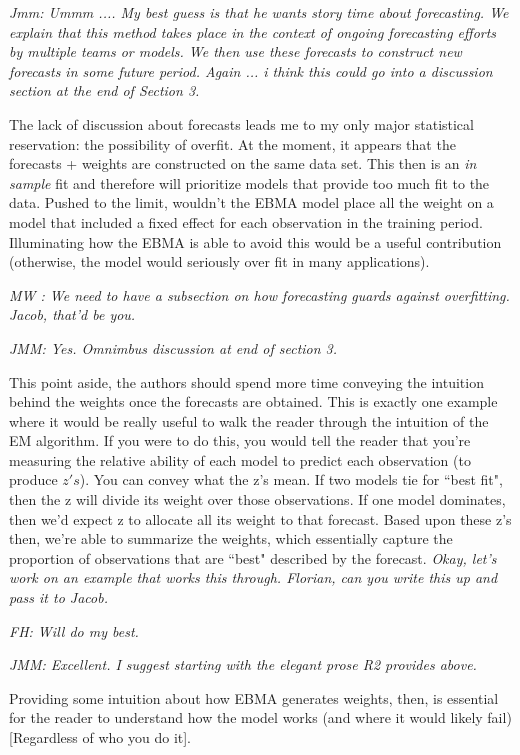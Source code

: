 \documentclass[10pt]{article}
\begin{document}
 {\it Jmm: Ummm .... My best guess is that he wants story time about forecasting.  We explain that this method takes place in the context of ongoing forecasting efforts by multiple teams or models.  We then use these forecasts to construct new forecasts in some future period.  Again ... i think this could go into a discussion section at the end of Section 3.}

The lack of discussion about forecasts leads me to my only major statistical reservation: the possibility of overfit.  At the moment, it appears that the forecasts + weights are constructed on the same data set.  This then is an \emph{in sample} fit and therefore will prioritize models that provide too much fit to the data.  Pushed to the limit, wouldn't the EBMA model place all the weight on a model that included a fixed effect for each observation in the training period.  Illuminating how the EBMA is able to avoid this would be a useful contribution (otherwise, the model would seriously over fit in many applications).

 {\it MW : We need to have a subsection on how forecasting guards against overfitting. Jacob, that'd be you.  }

 {\it JMM: Yes.  Omnimbus discussion at end of section 3.}

This point aside, the authors should spend more time conveying the intuition behind the weights once the forecasts are obtained.  This is exactly one example where it would be really useful to walk the reader through the intuition of the EM algorithm.  If you were to do this, you would tell the reader that you're measuring the relative ability of each model to predict each observation (to produce $z's$).  You can convey what the z's mean.  If two models tie for ``best fit", then the z will divide its weight over those observations.  If one model dominates, then we'd expect z to allocate all its weight to that forecast.  Based upon these z's then, we're able to summarize the weights, which essentially capture the proportion of observations that are ``best" described by the forecast.  
{\it Okay, let's work on an example that works this through. Florian, can you write this up and pass it to Jacob.}

{\it FH: Will do my best.}

{\it JMM: Excellent.  I suggest starting with the elegant prose R2 provides above.}

Providing some intuition about how EBMA generates weights, then, is essential for the reader to understand how the model works (and where it would likely fail) [Regardless of who you do it].
\end{document}

